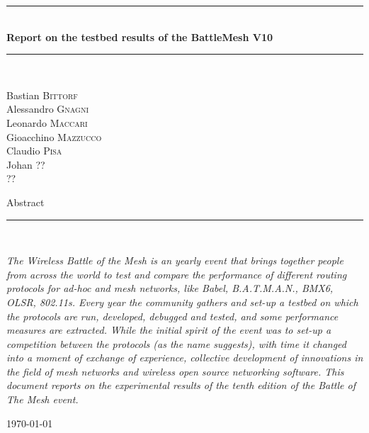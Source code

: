 \documentclass[10pt,onecolumn]{paper}
\newcommand{\HRule}{\rule{\linewidth}{0.5mm}}
\begin{document}
\begin{titlepage}
\begin{center}

\HRule \\[0.4cm]
{ \huge \bfseries Report on the testbed results of the BattleMesh V10 \\[0.4cm] }

\HRule \\[1.5cm]

\begin{minipage}{0.4\textwidth}
\begin{flushleft} \large
Bastian \textsc{Bittorf}\\
Alessandro \textsc{Gnagni}\\
Leonardo \textsc{Maccari}\\
Gioacchino \textsc{Mazzucco}\\
Claudio \textsc{Pisa}\\
Johan \textsc{??}\\
 \textsc{??}\\
\end{flushleft}
\end{minipage}
\begin{minipage}{0.4\textwidth}
\end{minipage}

\vfill
{\large Abstract}
\HRule \\[0.4cm]
\begin{flushleft}
\emph{The Wireless Battle of the Mesh is an yearly event that brings together
people from across the world to test and compare the performance of different routing
protocols for ad-hoc and mesh networks, like Babel, B.A.T.M.A.N., BMX6, OLSR,
802.11s. Every year the community gathers and set-up a testbed on which the
protocols are run, developed, debugged and tested, and some performance
measures are extracted. While the initial spirit of the event was to set-up a
competition between the protocols (as the name suggests), with time it changed
into a moment of exchange of experience, collective development of
innovations in the field of mesh networks and wireless open source
networking software. This document reports on the experimental results of the tenth edition
of the Battle of The Mesh event.}
\end{flushleft}
\vskip2cm

\vfill

{\large \today}

\end{center}
\end{titlepage}
\end{document}
